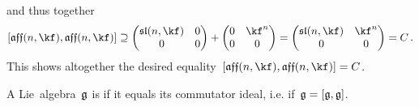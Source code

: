 \begin{example}
\begin{enumerate}
\[			\]
			and thus together
			\[
				[ \afflie(n, \kf), \afflie(n, \kf) ]
				\supseteq
				\begin{pmatrix}
					\sllie(n, \kf)  & 0 \\
					0               & 0
				\end{pmatrix}
				+
				\begin{pmatrix}
					0 & \kf^n \\
					0 & 0
				\end{pmatrix}
				=
				\begin{pmatrix}
					\sllie(n, \kf)  & \kf^n \\
					0               & 0
				\end{pmatrix}
				=
				C \,.
			\]
			This shows altogether the desired equality~$[ \afflie(n, \kf), \afflie(n, \kf) ] = C$.
	\end{enumerate}
\end{example}


\begin{definition}
	A Lie~algebra~$\mathfrak{g}$ is  if it equals its commutator ideal, i.e. if~$\mathfrak{g} = [\mathfrak{g}, \mathfrak{g}]$.
\end{definition}


